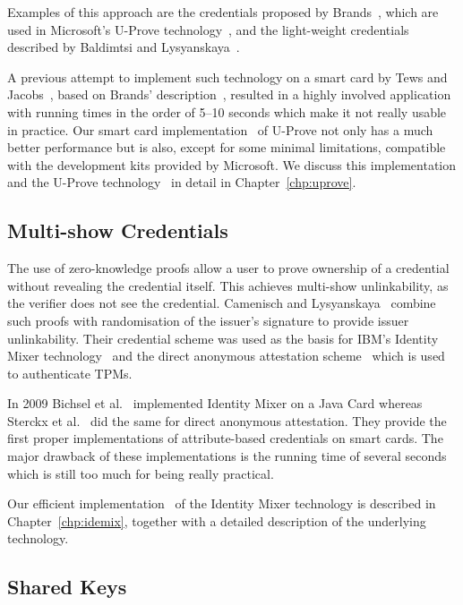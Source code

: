 Examples of this approach are the credentials proposed by
Brands~\cite{Brands2000}, which are used in Microsoft's U-Prove
technology~\cite{U-Prove_Crypto2013}, and the light-weight credentials described
by Baldimtsi and Lysyanskaya~\cite{BaLy2012}.

A previous attempt to implement such technology on a smart card by Tews and
Jacobs~\cite{TewsJacobs09}, based on Brands' description~\cite{Brands2000},
resulted in a highly involved application with running times in the order of
5--10 seconds which make it not really usable in practice. Our smart card
implementation~\cite{MostowskiVullers2011} of U-Prove not only has a much better
performance but is also, except for some minimal limitations, compatible with
the development kits provided by Microsoft. We discuss this implementation and
the U-Prove technology~\cite{U-Prove_Crypto2013} in detail in
Chapter~\ref{chp:uprove}.

\subsection{Multi-show Credentials}

The use of zero-knowledge proofs allow a user to prove ownership of a credential
without revealing the credential itself. This achieves multi-show unlinkability,
as the verifier does not see the credential. Camenisch and
Lysyanskaya~\cite{CamenischLysyanskaya2001,CamenischLysyanskaya2003} combine
such proofs with randomisation of the issuer's signature to provide issuer
unlinkability. Their credential scheme was used as the basis for IBM's Identity
Mixer technology~\cite{IdemixCrypto2013} and the direct anonymous attestation
scheme~\cite{BrickellCC04} which is used to authenticate TPMs. %

In 2009 Bichsel et al.~\cite{BichselCGS2009} implemented Identity Mixer on a
Java Card whereas Sterckx et al.~\cite{Sterckx09} did the same for direct
anonymous attestation. They provide the first proper implementations of
attribute-based credentials on smart cards. The major drawback of these
implementations is the running time of several seconds which is still too much
for being really practical.

Our efficient implementation~\cite{VullersAlpar2013} of the Identity Mixer
technology is described in Chapter~\ref{chp:idemix}, together with a detailed
description of the underlying technology.

\subsection{Shared Keys}

